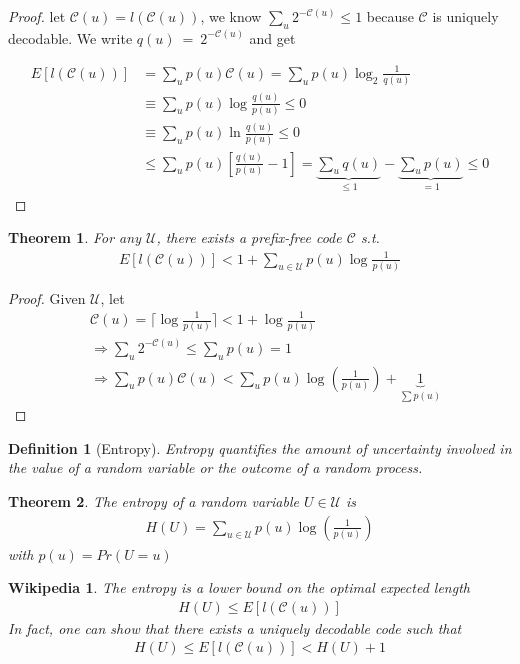 \documentclass[twoside]{article}
\newtheorem{theorem}{Theorem}[section]
\newtheorem*{wikipedia}{Wikipedia}
\newtheorem{definition}{Definition}[section]
\theoremstyle{definition} %
\def\U{\mathcal{U}}
\def\C{\mathcal{C}}
\begin{document}
\begin{proof}
  let $\C(u) = l(\C(u))$, we know $\sum_u 2^{-\C(u)} \leq 1$ because $\C$ is uniquely decodable. We write $q(u)~=~2^{-\C(u)}$ and get

  \begin{align*}
    E[l(\C(u))] &= \sum_u p(u) \C(u) = \sum_u p(u) \log_2\frac{1}{q(u)} \\
    &\equiv \sum_u p(u) \log\frac{q(u)}{p(u)} \leq 0 \\
    &\equiv \sum_u p(u) \ln\frac{q(u)}{p(u)} \leq 0 \\
    &\leq \sum_u p(u) \left[\frac{q(u)}{p(u)} - 1\right]
    = \underbrace{\sum_u q(u)}_{\leq 1} - \underbrace{\sum_u p(u)}_{=1} \leq 0
  \end{align*}
\end{proof}

\begin{theorem}
  For any $\U$, there exists a prefix-free code $\C$ s.t.
  \begin{align*}
    E[l(\C(u))] < 1 + \sum_{u \in \U} p(u) \log\frac{1}{p(u)}
  \end{align*}
\end{theorem}
\begin{proof}
  Given $\U$, let
  \begin{align*}
    &\C(u) = \lceil \log\frac{1}{p(u)} \rceil < 1 + \log \frac{1}{p(u)} \\
    &\Rightarrow \sum_u 2^{-\C(u)} \leq \sum_u p(u) = 1 \\
    &\Rightarrow \sum_u p(u) \C(u) < \sum_u p(u) \log(\frac{1}{p(u)}) + \underbrace{1}_{\sum p(u)}
  \end{align*}
\end{proof}

\begin{definition}[Entropy]
  Entropy quantifies the amount of uncertainty involved in the value of a random variable or the outcome of a random process.
\end{definition}

\begin{theorem}
  The entropy of a random variable $U \in \U$ is
  \begin{align*}
    H(U) = \sum_{u \in \U} p(u) \log(\frac{1}{p(u)})
  \end{align*}
  with $p(u) = Pr(U = u)$
\end{theorem}

\begin{wikipedia}
  The entropy is a lower bound on the optimal expected length
  \begin{align*}
    H(U) \leq E[l(\C(u))]
  \end{align*}
  In fact, one can show that there exists a uniquely decodable code such that
  \begin{align*}
     H(U) \leq E[l(\C(u))] < H(U) + 1
   \end{align*}
\end{wikipedia}
\end{document}
